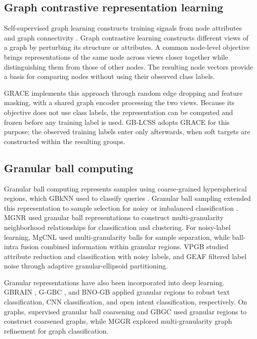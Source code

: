 \documentclass[10pt,letterpaper,nopreprintline]{elsarticle}
\theoremstyle{plain}
\begin{document}
\subsection{Graph contrastive representation learning}\label{sec:2.4}

Self-supervised graph learning constructs training signals from node attributes and graph connectivity \cite{ref57}. Graph contrastive learning constructs different views of a graph by perturbing its structure or attributes. A common node-level objective brings representations of the same node across views closer together while distinguishing them from those of other nodes. The resulting node vectors provide a basis for comparing nodes without using their observed class labels.

GRACE \cite{ref12} implements this approach through random edge dropping and feature masking, with a shared graph encoder processing the two views. Because its objective does not use class labels, the representation can be computed and frozen before any training label is used. GB-LCSS adopts GRACE for this purpose; the observed training labels enter only afterwards, when soft targets are constructed within the resulting groups.

\subsection{Granular ball computing}\label{sec:2.5}

Granular ball computing represents samples using coarse-grained hyperspherical regions, which GBkNN used to classify queries \cite{ref13}. Granular ball sampling extended this representation to sample selection for noisy or imbalanced classification \cite{ref15}. MGNR \cite{ref58} used granular ball representations to construct multi-granularity neighborhood relationships for classification and clustering. For noisy-label learning, MgCNL \cite{ref59} used multi-granularity balls for sample separation, while ball-intra fusion \cite{ref60} combined information within granular regions. VPGB \cite{ref61} studied attribute reduction and classification with noisy labels, and GEAF \cite{ref62} filtered label noise through adaptive granular-ellipsoid partitioning.

Granular representations have also been incorporated into deep learning. GBRAIN \cite{ref63}, G-GBC \cite{ref64}, and BNO-GB \cite{ref65} applied granular regions to robust text classification, CNN classification, and open intent classification, respectively. On graphs, supervised granular ball coarsening \cite{ref66} and GBGC \cite{ref67} used granular regions to construct coarsened graphs, while MGGR \cite{ref68} explored multi-granularity graph refinement for graph classification.
\end{document}
